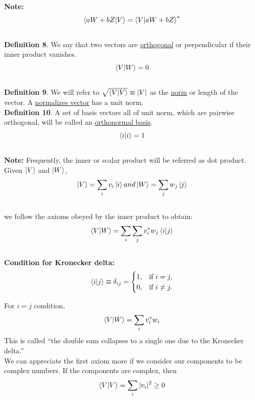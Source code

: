 \documentclass{article}
\begin{document}
\textbf{Note:}
\begin{equation}
    \braket{aW+bZ}{V} = \braket{V}{aW+bZ}^{*}
\end{equation}\\
\textbf{Definition 8}. We say that two vectors are \underline{orthogonal} or perpendicular if their inner product vanishes.
\begin{equation}
    \braket{V}{W} = 0
\end{equation}\\

\textbf{Definition 9}. We will refer to $\sqrt{\braket{V}{V}}\equiv|V| $ as the \underline{norm} or length of the vector. A \underline{normalizes vector} has a unit norm.
\\
\textbf{Definition 10}. A set of basis vectors all of unit norm, which are pairwise orthogonal, will be called an \underline{orthonormal basis}.
\begin{equation}
    \braket{i}{i}=1
\end{equation}\\
\textbf{Note:} Frequently, the inner or scalar product will be referred as dot product.\\
Given $\ket{V}$ and $\ket{W}$,
\begin{equation*}
    \ket{V} = \sum_{i}v_{i}\ket{i} and
    \ket{W} = \sum_{j}w_{j}\ket{j}
\end{equation*}\\
we follow the axioms obeyed by the inner product to obtain:
\begin{equation}
    \braket{V}{W} = \sum_{i}\sum_{j}v_{i}^{*}w_{j}\braket{i}{j}
\end{equation}\\
\textbf{Condition for Kronecker delta:}
\begin{equation}
    \braket{i}{j} \equiv \delta_{ij} =
    \begin{cases}
            1, &         \text{if } i=j,\\
            0, &         \text{if } i\neq j.
    \end{cases}
\end{equation}

For $i=j$ condition, 
\begin{equation}
    \braket{V}{W} = \sum_{i} v_{i}^{*} w_{i}
\end{equation}
This is called “the double sum collapses to a single one due to the Kronecker delta.”\\
We can appreciate the first axiom more if we consider our components to be complex numbers. If the components are complex, then 
\begin{equation}
    \braket{V}{V} = \sum_{i}|v_{i}|^{2} \geq 0
\end{equation}
\end{document}
